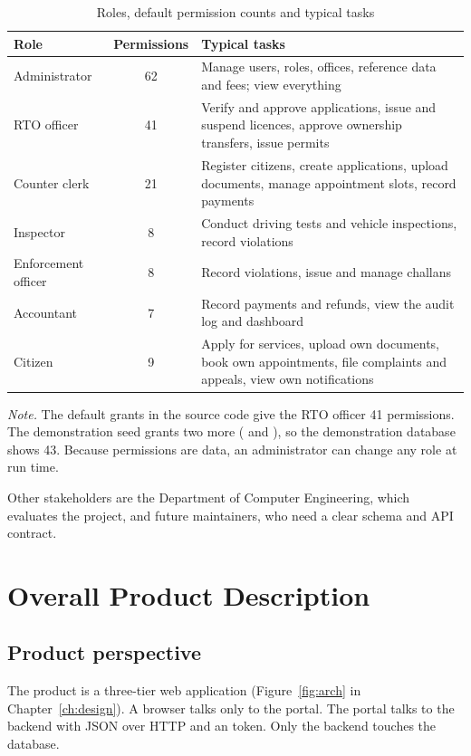 \begin{table}[H]
\centering\small
\caption{Roles, default permission counts and typical tasks}\label{tab:roles}
\begin{tabularx}{\linewidth}{@{}p{3.3cm}cX@{}}
\toprule
\textbf{Role} & \textbf{Permissions} & \textbf{Typical tasks}\\ \midrule
Administrator & 62 & Manage users, roles, offices, reference data and fees; view everything\\
RTO officer & 41 & Verify and approve applications, issue and suspend licences, approve ownership transfers, issue permits\\
Counter clerk & 21 & Register citizens, create applications, upload documents, manage appointment slots, record payments\\
Inspector & 8 & Conduct driving tests and vehicle inspections, record violations\\
Enforcement officer & 8 & Record violations, issue and manage challans\\
Accountant & 7 & Record payments and refunds, view the audit log and dashboard\\
Citizen & 9 & Apply for services, upload own documents, book own appointments, file complaints and appeals, view own notifications\\
\bottomrule
\end{tabularx}
\end{table}
\textit{Note.} The default grants in the source code give the RTO officer 41
permissions. The demonstration seed grants two more ( and
), so the demonstration database shows 43. Because
permissions are data, an administrator can change any role at run time.

Other stakeholders are the Department of Computer Engineering, which evaluates the
project, and future maintainers, who need a clear schema and API contract.

\section{Overall Product Description}
\subsection{Product perspective}
The product is a three-tier web application (Figure~\ref{fig:arch} in
Chapter~\ref{ch:design}). A browser talks only to the portal. The portal talks to the
backend with JSON over HTTP and an  token. Only the backend
touches the database.

